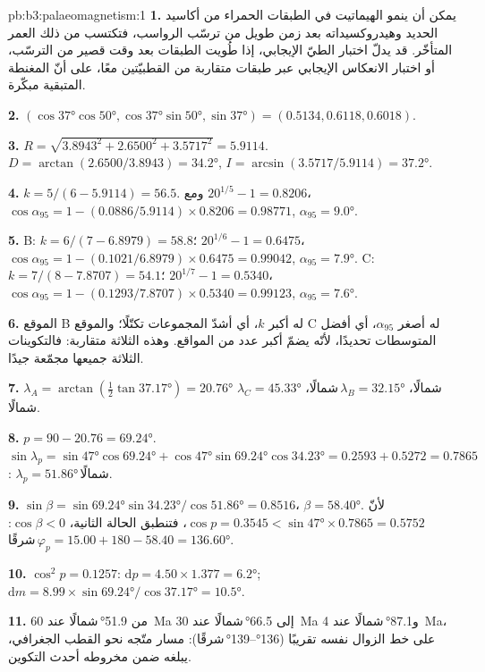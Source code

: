 \begin{solution}{pb:b3:palaeomagnetism:1}
\textbf{1.} يمكن أن ينمو الهيماتيت في الطبقات الحمراء من أكاسيد الحديد وهيدروكسيداته
بعد زمن طويل من ترسّب الرواسب، فتكتسب  من ذلك
العمر المتأخّر. قد يدلّ اختبار الطيّ الإيجابي، إذا طُويت الطبقات بعد وقت قصير
من الترسّب، أو اختبار الانعكاس الإيجابي عبر طبقات متقاربة من القطبيّتين معًا،
على أنّ المغنطة المتبقية مبكّرة.

\textbf{2.} $(\cos\ang{37}\cos\ang{50}, \cos\ang{37}\sin\ang{50}, \sin\ang{37})
= (0.5134, 0.6118, 0.6018)$.

\textbf{3.} $R = \sqrt{3.8943^2 + 2.6500^2 + 3.5717^2} = 5.9114$. $D =
\arctan(2.6500/3.8943) = \ang{34.2}$, $I = \arcsin(3.5717/5.9114) = \ang{37.2}$.

\textbf{4.} $k = 5/(6 - 5.9114) = 56.5$. ومع $20^{1/5} - 1 = 0.8206$،
$\cos\alpha_{95} = 1 - (0.0886/5.9114)\times0.8206 = 0.98771$, $\alpha_{95} =
\ang{9.0}$.

\textbf{5.} B: $k = 6/(7 - 6.8979) = 58.8$؛ $20^{1/6} - 1 = 0.6475$،
$\cos\alpha_{95} = 1 - (0.1021/6.8979)\times0.6475 = 0.99042$, $\alpha_{95} =
\ang{7.9}$. C: $k = 7/(8 - 7.8707) = 54.1$؛ $20^{1/7} - 1 = 0.5340$،
$\cos\alpha_{95} = 1 - (0.1293/7.8707)\times0.5340 = 0.99123$, $\alpha_{95} =
\ang{7.6}$.

\textbf{6.} الموقع B له أكبر $k$، أي أشدّ المجموعات تكتّلًا؛ والموقع C له أصغر
$\alpha_{95}$، أي أفضل المتوسطات تحديدًا، لأنّه يضمّ أكبر عدد من المواقع. وهذه الثلاثة
متقاربة: فالتكوينات الثلاثة جميعها مجمّعة جيدًا.

\textbf{7.} $\lambda_A = \arctan(\tfrac12\tan\ang{37.17}) = \ang{20.76}$\,شمالًا،
$\lambda_B = \ang{32.15}$\,شمالًا، $\lambda_C = \ang{45.33}$\,شمالًا.

\textbf{8.} $p = 90 - 20.76 = \ang{69.24}$. $\sin\lambda_p =
\sin\ang{47}\cos\ang{69.24} + \cos\ang{47}\sin\ang{69.24}\cos\ang{34.23} =
0.2593 + 0.5272 = 0.7865$: $\lambda_p = \ang{51.86}$\,شمالًا.

\textbf{9.} $\sin\beta = \sin\ang{69.24}\sin\ang{34.23}/\cos\ang{51.86} =
0.8516$، $\beta = \ang{58.40}$. لأنّ $\cos p = 0.3545 < \sin\ang{47}\times
0.7865 = 0.5752$، فتنطبق الحالة الثانية، $\cos\beta < 0$:
$\varphi_p = 15.00 + 180 - 58.40 = \ang{136.60}$\,شرقًا.

\textbf{10.} $\cos^2p = 0.1257$: $\mathrm dp = 4.50\times1.377 = \ang{6.2}$;
$\mathrm dm = 8.99\times\sin\ang{69.24}/\cos\ang{37.17} = \ang{10.5}$.

\textbf{11.} من \ang{51.9}\,شمالًا عند \qty{60}{Ma} إلى \ang{66.5}\,شمالًا عند
\qty{30}{Ma} و\ang{87.1}\,شمالًا عند \qty{4}{Ma}، على خط الزوال نفسه تقريبًا
(\ang{136}--\ang{139}\,شرقًا): مسار متّجه نحو القطب الجغرافي، يبلغه
ضمن مخروطه أحدث التكوين.


\end{solution}
